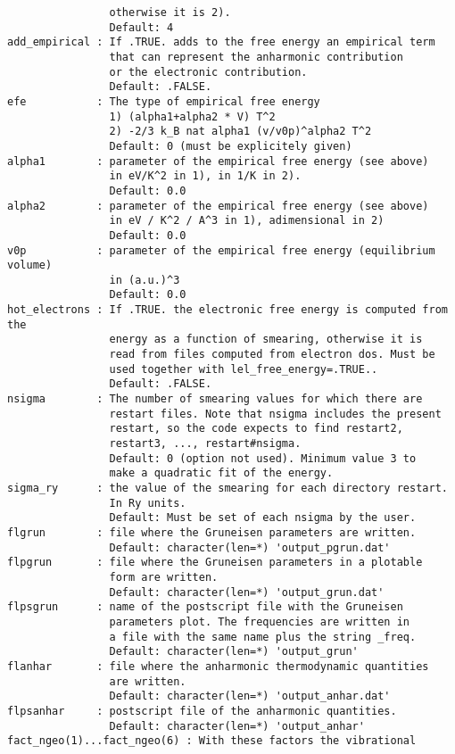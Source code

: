 \documentclass[12pt,a4paper,twoside]{report}
\begin{document}
\begin{verbatim}
                otherwise it is 2).
                Default: 4
add_empirical : If .TRUE. adds to the free energy an empirical term
                that can represent the anharmonic contribution 
                or the electronic contribution.
                Default: .FALSE.
efe           : The type of empirical free energy
                1) (alpha1+alpha2 * V) T^2
                2) -2/3 k_B nat alpha1 (v/v0p)^alpha2 T^2
                Default: 0 (must be explicitely given)
alpha1        : parameter of the empirical free energy (see above)
                in eV/K^2 in 1), in 1/K in 2). 
                Default: 0.0
alpha2        : parameter of the empirical free energy (see above)
                in eV / K^2 / A^3 in 1), adimensional in 2)
                Default: 0.0
v0p           : parameter of the empirical free energy (equilibrium volume)
                in (a.u.)^3
                Default: 0.0
hot_electrons : If .TRUE. the electronic free energy is computed from the
                energy as a function of smearing, otherwise it is
                read from files computed from electron dos. Must be
                used together with lel_free_energy=.TRUE..
                Default: .FALSE.
nsigma        : The number of smearing values for which there are
                restart files. Note that nsigma includes the present
                restart, so the code expects to find restart2, 
                restart3, ..., restart#nsigma.
                Default: 0 (option not used). Minimum value 3 to
                make a quadratic fit of the energy.
sigma_ry      : the value of the smearing for each directory restart.
                In Ry units.
                Default: Must be set of each nsigma by the user.
flgrun        : file where the Gruneisen parameters are written. 
                Default: character(len=*) 'output_pgrun.dat'
flpgrun       : file where the Gruneisen parameters in a plotable 
                form are written.
                Default: character(len=*) 'output_grun.dat'
flpsgrun      : name of the postscript file with the Gruneisen 
                parameters plot. The frequencies are written in 
                a file with the same name plus the string _freq.
                Default: character(len=*) 'output_grun'
flanhar       : file where the anharmonic thermodynamic quantities 
                are written.
                Default: character(len=*) 'output_anhar.dat'
flpsanhar     : postscript file of the anharmonic quantities.
                Default: character(len=*) 'output_anhar'
fact_ngeo(1)...fact_ngeo(6) : With these factors the vibrational 

\end{verbatim}
\end{document}
